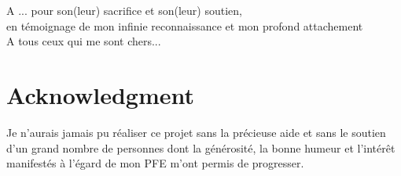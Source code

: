 \documentclass[a4paper, oneside, 12pt, final]{extreport}
\newcommand{\reportAuthor} {
  \textbf{Ulrich KEMKA TAKENGNY}
}
\newcommand{\studyDepartment} {%
  Entreprise d'accueil :
  
}
\begin{document}
\begin{center}
  {\it

    A ... pour son(leur) sacrifice et son(leur) soutien, \\
    en témoignage de mon infinie reconnaissance et mon profond attachement \\
    \vspace{1cm}
    A tous ceux qui me sont chers...

  }
\end{center}
%
%

\chapter*{Acknowledgment}
\thispagestyle{empty}
%

Je n'aurais jamais pu réaliser ce projet sans la précieuse aide et sans le soutien d'un grand nombre de personnes dont la générosité, la bonne humeur et l'intérêt manifestés à l'égard de mon PFE m'ont permis de progresser. \\


\end{document}
